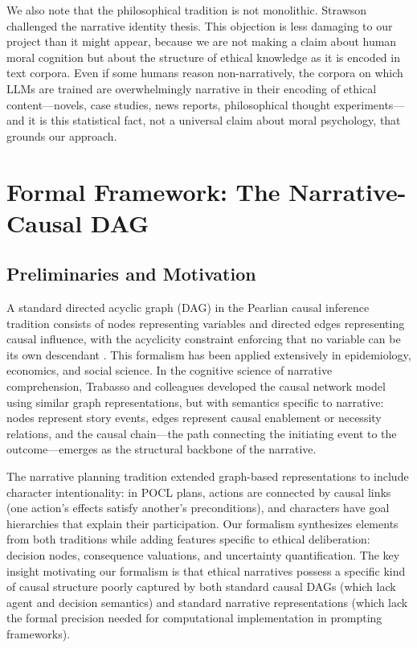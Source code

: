 \documentclass[11pt,letterpaper]{article}
\theoremstyle{defn}
\begin{document}
We also note that the philosophical tradition is not monolithic. Strawson \citeyearpar{strawson2004} challenged the narrative identity thesis. This objection is less damaging to our project than it might appear, because we are not making a claim about human moral cognition but about the structure of ethical knowledge as it is encoded in text corpora. Even if some humans reason non-narratively, the corpora on which LLMs are trained are overwhelmingly narrative in their encoding of ethical content---novels, case studies, news reports, philosophical thought experiments---and it is this statistical fact, not a universal claim about moral psychology, that grounds our approach.

\section{Formal Framework: The Narrative-Causal DAG}

\subsection{Preliminaries and Motivation}

A standard directed acyclic graph (DAG) in the Pearlian causal inference tradition consists of nodes representing variables and directed edges representing causal influence, with the acyclicity constraint enforcing that no variable can be its own descendant \citep{pearl2000}. This formalism has been applied extensively in epidemiology, economics, and social science. In the cognitive science of narrative comprehension, Trabasso and colleagues developed the causal network model using similar graph representations, but with semantics specific to narrative: nodes represent story events, edges represent causal enablement or necessity relations, and the causal chain---the path connecting the initiating event to the outcome---emerges as the structural backbone of the narrative.

The narrative planning tradition \citep{riedl2010} extended graph-based representations to include character intentionality: in POCL plans, actions are connected by causal links (one action's effects satisfy another's preconditions), and characters have goal hierarchies that explain their participation. Our formalism synthesizes elements from both traditions while adding features specific to ethical deliberation: decision nodes, consequence valuations, and uncertainty quantification. The key insight motivating our formalism is that ethical narratives possess a specific kind of causal structure poorly captured by both standard causal DAGs (which lack agent and decision semantics) and standard narrative representations (which lack the formal precision needed for computational implementation in prompting frameworks).
\end{document}
